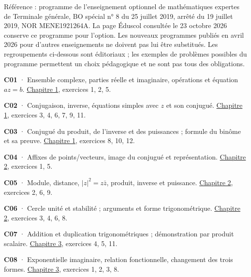 \label{concordance}
Référence : programme de l'enseignement optionnel de mathématiques expertes de Terminale générale, BO spécial n° 8 du 25 juillet 2019, arrêté du 19 juillet 2019, NOR MENE1921264A.
La page Éduscol consultée le 23 octobre 2026 conserve ce programme pour l'option. Les nouveaux programmes publiés en avril 2026 pour d'autres enseignements ne doivent pas lui être substitués.
Les regroupements ci-dessous sont éditoriaux ; les exemples de problèmes possibles du programme permettent un choix pédagogique et ne sont pas tous des obligations.
\par\vspace{3mm}
\noindent\textbf{C01} · Ensemble complexe, parties réelle et imaginaire, opérations et équation $az=b$. \hyperref[chap-1]{Chapitre 1}, exercices 1, 2, 5.\par\vspace{1.7mm}
\noindent\textbf{C02} · Conjugaison, inverse, équations simples avec $z$ et son conjugué. \hyperref[chap-1]{Chapitre 1}, exercices 3, 4, 6, 7, 9, 11.\par\vspace{1.7mm}
\noindent\textbf{C03} · Conjugué du produit, de l’inverse et des puissances ; formule du binôme et sa preuve. \hyperref[chap-1]{Chapitre 1}, exercices 8, 10, 12.\par\vspace{1.7mm}
\noindent\textbf{C04} · Affixes de points/vecteurs, image du conjugué et représentation. \hyperref[chap-2]{Chapitre 2}, exercices 1, 5.\par\vspace{1.7mm}
\noindent\textbf{C05} · Module, distance, $|z|^2=z\bar z$, produit, inverse et puissance. \hyperref[chap-2]{Chapitre 2}, exercices 2, 6, 9.\par\vspace{1.7mm}
\noindent\textbf{C06} · Cercle unité et stabilité ; arguments et forme trigonométrique. \hyperref[chap-2]{Chapitre 2}, exercices 3, 4, 6, 8.\par\vspace{1.7mm}
\noindent\textbf{C07} · Addition et duplication trigonométriques ; démonstration par produit scalaire. \hyperref[chap-3]{Chapitre 3}, exercices 4, 5, 11.\par\vspace{1.7mm}
\noindent\textbf{C08} · Exponentielle imaginaire, relation fonctionnelle, changement des trois formes. \hyperref[chap-3]{Chapitre 3}, exercices 1, 2, 3, 8.\par\vspace{1.7mm}
